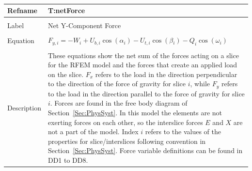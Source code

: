 \documentclass[12pt]{article}
\begin{document}
~\newline
\noindent \begin{minipage}{\textwidth}
\begin{tabular}{p{} p{}}
\toprule \textbf{Refname} & \textbf{T:netForce}
\label{T:netForce}
\\ \midrule \\
Label & Net Y-Component Force
\\ \midrule \\
Equation & ${F_{y,i}}=-W_{i}+{U_{b,i}} \cos\left(\alpha{}_{i}\right)-{U_{t,i}} \cos\left(\beta{}_{i}\right)-Q_{i} \cos\left(\omega{}_{i}\right)$
\\ \midrule \\
Description & These equations show the net sum of the forces acting on a slice for the RFEM model and the forces that create an applied load on the slice. ${F_{x}}$ refers to the load in the direction perpendicular to the direction of the force of gravity for slice $i$, while ${F_{y}}$ refers to the load in the direction parallel to the force of gravity for slice $i$. Forces are found in the free body diagram of Section~\ref{Sec:PhysSyst}. In this model the elements are not exerting forces on each other, so the interslice forces $E$ and $X$ are not a part of the model. Index $i$ refers to the values of the properties for slice/interslices following convention in Section~\ref{Sec:PhysSyst}. Force variable definitions can be found in DD1 to DD8.
\\ \bottomrule \end{tabular}
\end{minipage}\\
~\newline
\end{document}
